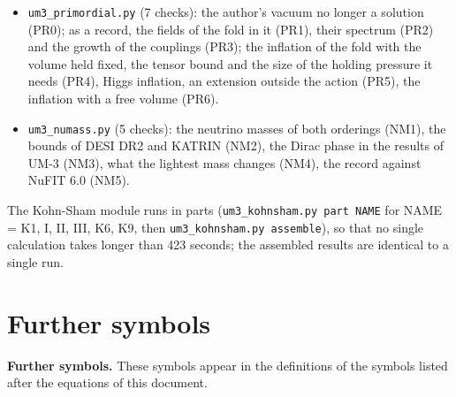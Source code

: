 \documentclass[
  10pt,
]{article}
\begin{document}
\begin{itemize}
\item
  \texttt{um3\_primordial.py} (7 checks): the author's vacuum no longer
  a solution (PR0); as a record, the fields of the fold in it (PR1),
  their spectrum (PR2) and the growth of the couplings (PR3); the
  inflation of the fold with the volume held fixed, the tensor bound and
  the size of the holding pressure it needs (PR4), Higgs inflation, an
  extension outside the action (PR5), the inflation with a free volume
  (PR6).
\item
  \texttt{um3\_numass.py} (5 checks): the neutrino masses of both
  orderings (NM1), the bounds of DESI DR2 and KATRIN (NM2), the Dirac
  phase in the results of UM-3 (NM3), what the lightest mass changes
  (NM4), the record against NuFIT 6.0 (NM5).
\end{itemize}

The Kohn-Sham module runs in parts
(\texttt{um3\_kohnsham.py\ part\ NAME} for NAME = K1, I, II, III, K6,
K9, then \texttt{um3\_kohnsham.py\ assemble}), so that no single
calculation takes longer than 423 seconds; the assembled results are
identical to a single run.

\hypertarget{further-symbols}{%
\section{Further symbols}\label{further-symbols}}

\textbf{Further symbols.} These symbols appear in the definitions of the
symbols listed after the equations of this document.
\end{document}
